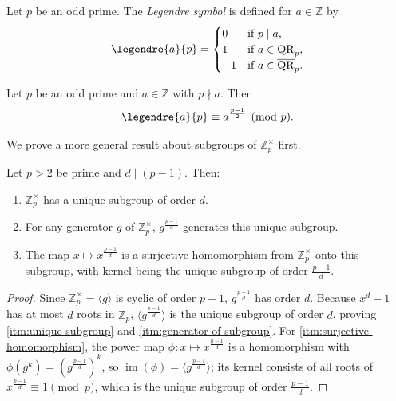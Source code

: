 
\begin{definition}
    Let \(p\) be an odd prime.
    The \emph{Legendre symbol} is defined for \(a \in \mathbb{Z}\) by
    \[
        \legendre{a}{p} =
        \begin{cases}
            0 & \text{if } p \mid a, \\
            1 & \text{if } a \in \operatorname{QR}_p, \\
            -1 & \text{if } a \in \overline{\operatorname{QR}}_p.
        \end{cases}
    \]
\end{definition}

\begin{theorem} \label{thm:euler-criterion}
    Let \(p\) be an odd prime and \(a \in \mathbb{Z}\) with \(p \nmid a\).
    Then
    \[
        \legendre{a}{p} \equiv a^{\frac{p-1}{2}} \pmod{p}.
    \]
\end{theorem}

We prove a more general result about subgroups of \(\mathbb{Z}_p^\times\) first.

\begin{theorem} \label{thm:unique-subgroup-of-order-d}
    Let \(p > 2\) be prime and \(d \mid (p-1)\). Then:
    \begin{enumerate}[label=\textup{(\roman*)}]
        \item \label{itm:unique-subgroup}
        \(\mathbb{Z}_p^\times\) has a unique subgroup of order \(d\).
        \item \label{itm:generator-of-subgroup}
        For any generator \(g\) of \(\mathbb{Z}_p^\times\), \(g^{\frac{p-1}{d}}\) generates this unique subgroup.
        \item \label{itm:surjective-homomorphism}
        The map \(x \mapsto x^{\frac{p-1}{d}}\) is a surjective homomorphism from \(\mathbb{Z}_p^\times\) onto this subgroup, with kernel being the unique subgroup of order \(\frac{p-1}{d}\).
    \end{enumerate}
\end{theorem}

\begin{proof}
    Since \(\mathbb{Z}_p^\times = \langle g \rangle\) is cyclic of order \(p-1\), \(g^{\frac{p-1}{d}}\) has order \(d\).
    Because \(x^d - 1\) has at most \(d\) roots in \(\mathbb{Z}_p\), \(\langle g^{\frac{p-1}{d}} \rangle\) is the unique subgroup of order \(d\), proving \ref{itm:unique-subgroup} and \ref{itm:generator-of-subgroup}.
    For \ref{itm:surjective-homomorphism}, the power map \(\phi \colon x \mapsto x^{\frac{p-1}{d}}\) is a homomorphism with \(\phi(g^k) = (g^{\frac{p-1}{d}})^k\), so \(\operatorname{im}(\phi) = \langle g^{\frac{p-1}{d}} \rangle\); its kernel consists of all roots of \(x^{\frac{p-1}{d}} \equiv 1 \pmod{p}\), which is the unique subgroup of order \(\frac{p-1}{d}\).
\end{proof}

